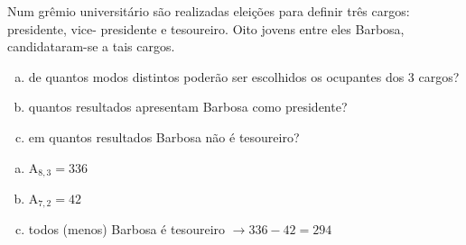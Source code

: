 \begin{ex}
Num grêmio universitário são realizadas eleições para definir três cargos: presidente, vice- presidente e tesoureiro. Oito jovens entre eles Barbosa, candidataram-se a tais cargos.
   \begin{enumerate}[(a)]
   \item de quantos modos distintos poderão ser escolhidos os ocupantes dos 3 cargos?
   \item quantos resultados apresentam Barbosa como presidente?
   \item em quantos resultados Barbosa não é tesoureiro?
   \end{enumerate}
     \begin{sol}
     \phantom{A}
       \begin{enumerate} [(a)]
           \item $\mathrm{A}_{8,3}=336$
           \item $\mathrm{A}_{7,2}=42$
           \item todos (menos) Barbosa é tesoureiro $\rightarrow 336-42=294$
       \end{enumerate}
     \end{sol}
\end{ex}